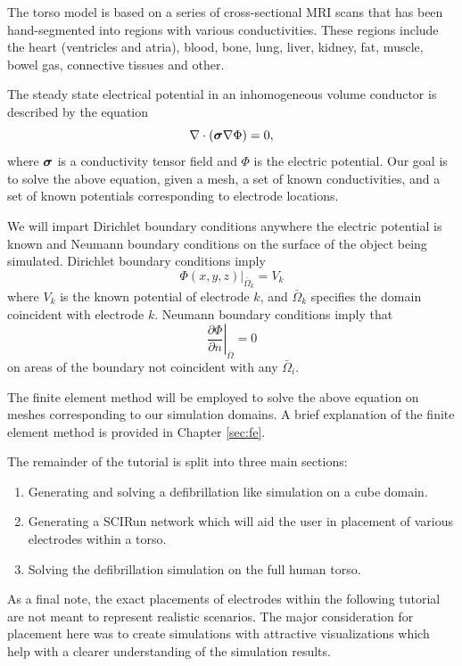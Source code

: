 \documentclass[fleqn,11pt,openany]{book}
\newcommand{\BM }[1]{\mbox{\boldmath $#1$}}
\begin{document}
The torso model is based on a series of cross-sectional MRI scans that
has been hand-segmented into regions with various
conductivities. These regions include the heart (ventricles and atria), blood, bone, lung, liver, kidney, fat, muscle, bowel gas, connective tissues and other.

The steady state electrical potential in an inhomogeneous volume
conductor is described by the equation
%
\begin{equation} \nabla \cdot (\BM{\sigma} \nabla \Phi) = 0,
\end{equation}
%
where $\BM{\sigma}$ is a conductivity tensor field and $\Phi$ is the
electric potential. Our goal is to solve the above equation, given a
mesh, a set of known conductivities, and a set of known potentials
corresponding to electrode locations.

We will impart Dirichlet boundary conditions anywhere the electric
potential is known and Neumann boundary conditions on the surface of
the object being simulated. Dirichlet boundary conditions imply
%
\begin{equation} \Phi(x,y,z)|_{\bar{\Omega}_k} = V_k
\end{equation}
%
where $V_k$ is the known potential of electrode $k$, and
$\bar{\Omega}_k$ specifies the domain coincident with electrode
$k$. Neumann boundary conditions imply that
%
\begin{equation} \left. \frac{\partial \Phi}{\partial n}
\right|_{\bar{\Omega}} = 0
\end{equation}
%
on areas of the boundary not coincident with any $\bar{\Omega}_i$.

The finite element method will be employed to solve the above equation
on meshes corresponding to our simulation domains. A brief explanation
of the finite element method is provided in Chapter \ref{sec:fe}.

The remainder of the tutorial is split into three main sections:
\begin{enumerate}
\item Generating and solving a defibrillation like simulation on a cube
domain.
\item Generating a SCIRun network which will aid the user in
placement of various electrodes within a torso.
\item Solving the defibrillation simulation on the full human torso.
\end{enumerate}

As a final note, the exact placements of electrodes within the
following tutorial are not meant to represent realistic scenarios. The
major consideration for placement here was to create simulations with
attractive visualizations which help with a clearer understanding of
the simulation results.
\end{document}

